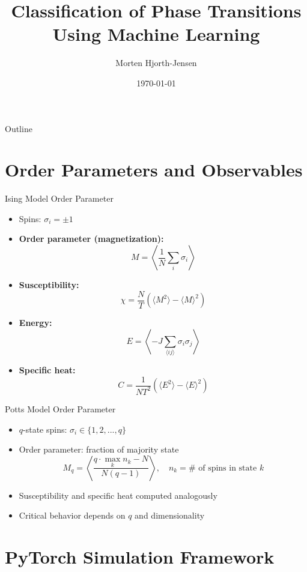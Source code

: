 \documentclass{beamer}
\title{Classification of Phase Transitions Using Machine Learning}
\author{Morten Hjorth-Jensen}
\institute{University of Oslo}
\date{\today}
\begin{document}
\frame{\titlepage}

\begin{frame}{Outline}
 \tableofcontents
\end{frame}


\section{Order Parameters and Observables}

\begin{frame}{Ising Model Order Parameter}
 \begin{itemize}
   \item Spins: $\sigma_i = \pm 1$
   \item \textbf{Order parameter (magnetization):}
   \[
   M = \left\langle \frac{1}{N} \sum_i \sigma_i \right\rangle
   \]
   \item \textbf{Susceptibility:}
   \[
   \chi = \frac{N}{T} (\langle M^2 \rangle - \langle M \rangle^2)
   \]
   \item \textbf{Energy:}
   \[
   E = \left\langle -J \sum_{\langle ij \rangle} \sigma_i \sigma_j \right\rangle
   \]
   \item \textbf{Specific heat:}
   \[
   C = \frac{1}{NT^2} (\langle E^2 \rangle - \langle E \rangle^2)
   \]
 \end{itemize}
\end{frame}

\begin{frame}{Potts Model Order Parameter}
 \begin{itemize}
   \item $q$-state spins: $\sigma_i \in \{1, 2, ..., q\}$
   \item Order parameter: fraction of majority state
   \[
   M_q = \left\langle \frac{q \cdot \max_k n_k - N}{N(q - 1)} \right\rangle, \quad n_k = \text{# of spins in state } k
   \]
   \item Susceptibility and specific heat computed analogously
   \item Critical behavior depends on $q$ and dimensionality
 \end{itemize}
\end{frame}


\section{PyTorch Simulation Framework}
\end{document}
